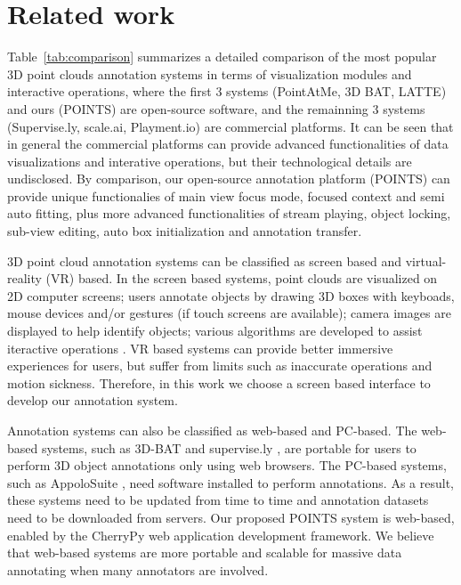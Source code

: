 \documentclass[letterpaper, 10 pt, conference]{ieeeconf}  %
\begin{document}
\section{Related work}
\label{sec:realtedwork}



Table~\ref{tab:comparison} summarizes a detailed comparison of the most popular 3D point clouds annotation systems in terms of visualization modules and interactive operations, where the first 3 systems (PointAtMe\cite{pointatme}, 3D BAT\cite{Zimmer20193DBA}, LATTE\cite{Wang2019LATTEAL}) and ours (POINTS) are open-source software, 
and the remainning 3 systems (Supervise.ly\cite{SUPERVISELY}, scale.ai\cite{scale}, Playment.io\cite{Playment}) are commercial platforms. 
It can be seen that in general the commercial platforms can provide advanced functionalities of data visualizations and interative operations, 
but their technological details are undisclosed. 
By comparison, our open-source annotation platform (POINTS) can provide unique functionalies of main view focus mode, focused context and semi
auto fitting, plus more advanced functionalities of stream playing, object locking, sub-view editing, auto box initialization and annotation transfer.

3D point cloud annotation systems can be classified as screen based and virtual-reality (VR) based. 
In the screen based systems, point clouds are visualized on 2D computer screens; users annotate objects by drawing 3D boxes with
keyboads, mouse devices and/or gestures (if touch screens are available)\cite{LabelMe3D}; camera images are displayed to help identify objects; various algorithms are developed to assist iteractive operations \cite{Wang2019LATTEAL}. 
VR based systems can provide better immersive experiences for users\cite{pointatme, gothentag}, but suffer from limits such as inaccurate operations and motion sickness. 
Therefore, in this work we choose a screen based interface to develop our annotation system.

Annotation systems can also be classified as web-based and PC-based. 
The web-based systems, such as 3D-BAT\cite{Zimmer20193DBA} and supervise.ly \cite{SUPERVISELY}, are portable for users to perform 3D object annotations only using web browsers. 
The PC-based systems, such as AppoloSuite \cite{wang2019apolloscape}, need software installed to perform annotations. 
As a result, these systems need to be updated from time to time and annotation datasets need to be downloaded from servers. 
Our proposed POINTS system is web-based, enabled by the CherryPy \cite{cherrypy} web application development framework. 
We believe that web-based systems are more portable and scalable for massive data annotating when many annotators are involved.
\end{document}
